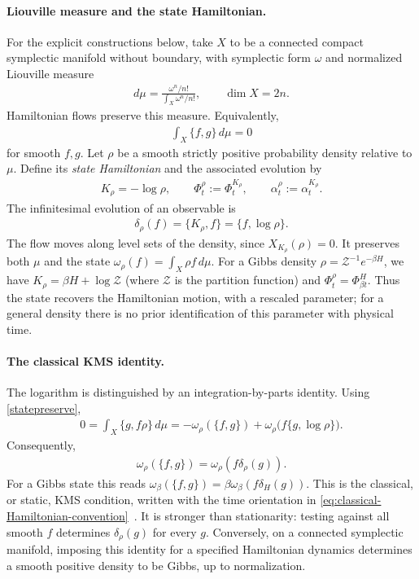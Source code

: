 \documentclass[a4paper,11pt]{article}
\theoremstyle{definition}
\theoremstyle{remark}
\begin{document}
\paragraph{Liouville measure and the state Hamiltonian.}
For the explicit constructions below, take $X$ to be a connected compact symplectic
manifold without boundary, with symplectic form $\omega$ and normalized Liouville
measure
\begin{align}
    d\mu=\frac{\omega^n/n!}{\int_X\omega^n/n!},\qquad \dim X=2n.
\end{align}
Hamiltonian flows preserve this measure.  Equivalently,
\begin{align}\label{statepreserve}
    \int_X\{f,g\}\,d\mu=0
\end{align}
for smooth $f,g$.  Let $\rho$ be a smooth strictly positive probability density
relative to $\mu$.  Define its \emph{state Hamiltonian} and the associated evolution by
\begin{align}\label{eq:classical-state-Hamiltonian}
    K_\rho=-\log\rho,\qquad
    \Phi_t^\rho:=\Phi_t^{K_\rho},\qquad
    \alpha_t^\rho:=\alpha_t^{K_\rho}.
\end{align}
The infinitesimal evolution of an observable is
\begin{align}\label{eq:classical-state-derivation}
    \delta_\rho(f)=\{K_\rho,f\}=\{f,\log\rho\}.
\end{align}
The flow moves along level sets of the density, since $X_{K_\rho}(\rho)=0$.  It
preserves both $\mu$ and the state $\omega_\rho(f)=\int_X\rho f\,d\mu$.  For a Gibbs
density $\rho=\mathcal{Z}^{-1}e^{-\beta H}$, we have $K_\rho=\beta H+\log\mathcal{Z}$
(where $\mathcal{Z}$ is the partition function) and $\Phi_t^\rho=\Phi_{\beta t}^H$.
Thus the state recovers the Hamiltonian motion, with a rescaled parameter; for a
general density there is no prior identification of this parameter with physical time.
 
\paragraph{The classical KMS identity.}
The logarithm is distinguished by an integration-by-parts identity.  Using
\eqref{statepreserve},
\begin{align}
    0=\int_X\{g,f\rho\}\,d\mu
    =-\omega_\rho(\{f,g\})+
    \omega_\rho\bigl(f\{g,\log\rho\}\bigr).
\end{align}
Consequently,
\begin{align}\label{KMSclassical}
    \omega_\rho(\{f,g\})=\omega_\rho(f\delta_\rho(g)).
\end{align}
For a Gibbs state this reads $\omega_\beta(\{f,g\})=\beta\omega_\beta(f\delta_H(g))$.
This is the classical, or static, KMS condition, written with the time orientation in
\eqref{eq:classical-Hamiltonian-convention}~\cite{vanDeVen2022}.  It is stronger than
stationarity: testing against all smooth $f$ determines $\delta_\rho(g)$ for every
$g$.  Conversely, on a connected symplectic manifold, imposing this identity for a
specified Hamiltonian dynamics determines a smooth positive density to be Gibbs, up to
normalization.
 
\end{document}
